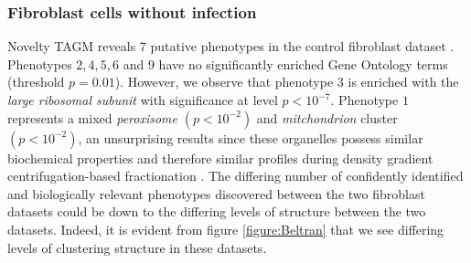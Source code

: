 \documentclass[12pt,english]{article}
\begin{document}
\subsubsection{Fibroblast cells without infection} 
Novelty TAGM reveals $7$ putative phenotypes in the control fibroblast dataset \citep{Jean_Beltran:2016}. Phenotypes $2,4,5,6$ and $9$ have no significantly enriched Gene Ontology terms (threshold $p = 0.01$). However, we observe that phenotype $3$ is enriched with the \textit{large ribosomal subunit} with significance at level $p < 10^{-7} $. Phenotype $1$ represents a mixed \textit{peroxisome} $(p < 10^{-2})$ and \textit{mitchondrion} cluster $(p < 10 ^{-2})$, an unsurprising results since these organelles possess similar biochemical properties and therefore similar profiles during density gradient centrifugation-based fractionation \citep{DC:2018, Dealtry:1992}. The differing number of confidently identified and biologically relevant phenotypes discovered between the two fibroblast datasets could be down to the differing levels of structure between the two datasets. Indeed, it is evident from figure \ref{figure:Beltran} that we see differing levels of clustering structure in these datasets.
\end{document}
